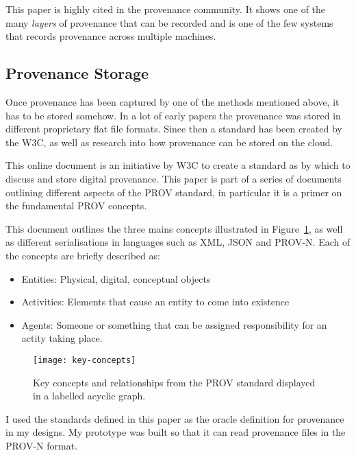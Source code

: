 This paper is highly cited in the provenance community. It shows one of the many \textit{layers} of provenance that can be recorded and is one of the few systems that records provenance across multiple machines. 

\subsection{Provenance Storage}
\label{sec:provenance_storage}

Once provenance has been captured by one of the methods mentioned above, it has to be stored somehow. In a lot of early papers the provenance was stored in different proprietary flat file formats. Since then a standard has been created by the W3C, as well as research into how provenance can be stored on the cloud.


This online document is an initiative by W3C to create a standard as by which to discuss and store digital provenance. This paper is part of a series of documents outlining different aspects of the PROV standard, in particular it is a primer on the fundamental PROV concepts.

This document outlines the three mains concepts illustrated in Figure~\ref{fig:key-concepts}, as well as different serialisations in languages such as XML, JSON and PROV-N. Each of the concepts are briefly described as:
\begin{itemize}
	\item Entities: Physical, digital, conceptual objects
	\item Activities: Elements that cause an entity to come into existence
	\item Agents: Someone or something that can be assigned responsibility for an actity taking place.  
\end{itemize}

\begin{figure}[h]
	\centering
	\texttt{[image: key-concepts]}
	\caption{Key concepts and relationships from the PROV standard displayed in a labelled acyclic graph.}
	\label{fig:key-concepts}
\end{figure}

I used the standards defined in this paper as the oracle definition for provenance in my designs. My prototype was built so that it can read provenance files in the PROV-N format.


